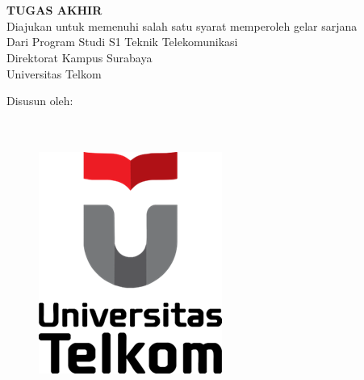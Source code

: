 
\begin{titlepage}
    \begin{center}      
        \bo{\Judul} \\[0.55cm]
        
        \vspace*{1 cm}
        \textit{\bo{\JudulInggris}} \\[1.5cm]    
        \textbf{TUGAS AKHIR}\\
        Diajukan untuk memenuhi salah satu syarat memperoleh gelar sarjana\\
        Dari Program Studi S1 Teknik Telekomunikasi \\
        Direktorat Kampus Surabaya \\
        Universitas Telkom

        \vspace*{1 cm}       
        Disusun oleh:\\
        \bo{\Penulis} \\
        \bo{\nim} \\

        \vspace*{1.0cm}
        
        \begin{figure}
            \begin{center}
                \includegraphics[scale=1]{pics/pengantar/TelU.png}
            \end{center}
        \end{figure}
        \vspace*{1.0cm}
    \end{center}
\end{titlepage}
